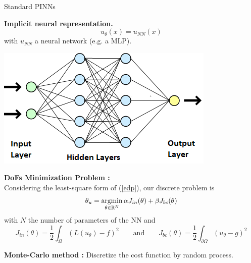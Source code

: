 \begin{frame}{Standard PINNs}
	\begin{minipage}{0.6\linewidth}
		\textbf{Implicit neural representation.}
		\begin{equation*}
			u_\theta(x)=u_{NN}(x)
		\end{equation*}
		with $u_{NN}$ a neural network (e.g. a MLP).
	\end{minipage}
	\begin{minipage}{0.36\linewidth}
		\includegraphics[width=0.95\linewidth]{images/learn_levelset/MLP_schema.png}
	\end{minipage}
	
	\vspace{5pt}
	
	\textbf{DoFs Minimization Problem :} \\
	Considering the least-square form of (\ref{edp}), our discrete problem is
	\begin{equation}
		\displaystyle \theta_u=\operatorname*{argmin}_{\theta\in\mathbb{R}^N} \alpha J_{in}(\theta)+\beta J_{bc}(\theta) \label{minpb_pinns}
	\end{equation}
	with $N$ the number of parameters of the NN and
	\begin{equation*}
		J_{in}(\theta)=\frac{1}{2}\int_\Omega (L(u_\theta) - f)^2  \qquad \text{and} \qquad J_{bc}(\theta)=\frac{1}{2}\int_{\partial\Omega} (u_\theta-g)^2
	\end{equation*}	
	
	\textbf{Monte-Carlo method :} Discretize the cost function by random process.
\end{frame}

